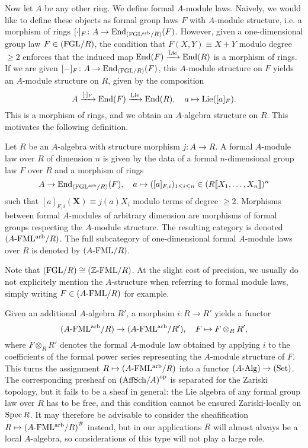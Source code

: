 \documentclass[../main.tex]{subfiles}
\begin{document}
Now let $A$ be any other ring. We define formal $A$-module laws. Naively, we
would like to define these objects as formal group laws $F$
with $A$-module structure, i.e. a morphism of rings $[\cdot]_F\colon A \to
\operatorname{End}_{(\mathrm{FGL^{arb}}/{R})}(F)$. However, given a one-dimensional group law $F \in
{(\mathrm{FGL}/{R})}$, the condition that $F(X,Y) \equiv X+Y$ modulo degree $\geq 2$
enforces that the induced map $\operatorname{End}(F) \xrightarrow{\operatorname{Lie}} \operatorname{End}(R)$ is a morphism of rings. 
If we are given $[-]_F\colon  A \to \operatorname{End}_{{(\mathrm{FGL}/{R})}}(F)$, this $A$-module structure on $F$ 
yields an $A$-module structure on $R$, given by the composition
\begin{equation*}
  A \xrightarrow{[\cdot]_F} \operatorname{End}(F) \xrightarrow{\operatorname{Lie}} \operatorname{End}(R), \quad a \mapsto \operatorname{Lie}([a]_F).
\end{equation*}
This is a morphism of rings, and we obtain an $A$-algebra structure on $R$. 
This motivates the following definition.
\begin{defi}\label{def:formalmodulelaw}
  Let $R$ be an $A$-algebra with structure morphism $j\colon  A \to R$. A formal
  $A$-module law over $R$ of dimension $n$ is given by the data of 
  a formal $n$-dimensional group law $F$ over $R$ and a morphism of rings
  \begin{equation*}
    A \to \operatorname{End}_{{(\mathrm{FGL^{arb}}/{R})}} (F), \quad a \mapsto ([a]_{F,i}
    )_{1 \leq i \leq n} \in (R \llbracket X_1, \dots, X_n \rrbracket )^n
  \end{equation*}
  such that $[a]_{F,i}(\mathbf X) \equiv j(a) X_i$ modulo terms of degree 
  $\geq 2$. Morphisms between formal $A$-modules of arbitrary dimension are 
  morphisms of formal groups respecting the $A$-module structure. 
  The resulting category is denoted ${({A}\text-\allowbreak\mathrm{FML^{arb}}/{R})}$. The full
  subcategory of one-dimensional formal $A$-module laws over $R$ is denoted 
  by ${({A}\text-\allowbreak\mathrm{FML}/{R})}$.
\end{defi}

Note that ${(\mathrm{FGL}/{R})} \cong {({\mathbb{Z}}\text-\allowbreak\mathrm{FML}/{R})}$.
At the slight cost of precision, we usually do not explicitely mention the
$A$-structure when referring to formal module laws, simply writing $F \in
{({A}\text-\allowbreak\mathrm{FML}/{R})}$ for example. 

Given an additional $A$-algebra $R'$, a morphsim
$i\colon R \to R'$ yields a functor 
\begin{equation*}
    {({A}\text-\allowbreak\mathrm{FML^{arb}}/{R})} \to {({A}\text-\allowbreak\mathrm{FML^{arb}}/{R'})}, \quad
    F \mapsto F \otimes_R R',
\end{equation*}
where $F \otimes_R R'$ denotes the formal $A$-module law obtained by applying $i$
to the coefficients of the formal power series representing the $A$-module structure of $F$. 
This turns the assignment $R \mapsto {({A}\text-\allowbreak\mathrm{FML^{arb}}/{R})}$ into a 
functor ${({A}\text-\allowbreak\mathrm{Alg})} \to {(\mathrm{Set})}$. The corresponding presheaf on ${(\mathrm{AffSch}/{A})}^{\mathrm{op}}$ is  separated for the Zariski topology, 
but it fails to be a sheaf in general: the Lie algebra of any
formal group law over $R$ has to be free, and this condition cannot be 
ensured Zariski-locally on $\operatorname{Spec} R$. It may therefore be 
advisable to consider the sheafification $R \mapsto {({A}\text-\allowbreak\mathrm{FML^{arb}}/{R})}^\#$ instead, but in our applications
$R$ will almost always be a local $A$-algebra, so considerations
of this type will not play a large role.
\end{document}
